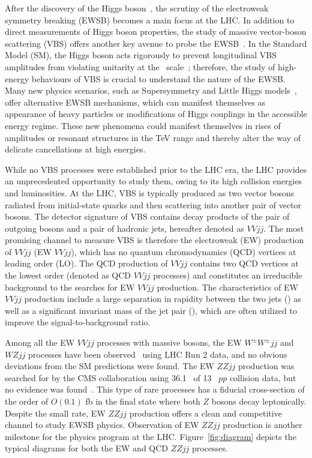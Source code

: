 After the discovery of the Higgs boson~\cite{HIGG-2012-27,CMS-HIG-12-028}, the scrutiny of the electroweak symmetry breaking (EWSB) becomes a main focus at the LHC. In addition to direct measurements of Higgs boson properties, the study of massive vector-boson scattering (VBS) offers another key avenue to probe the EWSB~\cite{Lee:1977yc,Chanowitz:1985hj,Szleper:2014xxa}. In the Standard Model (SM), the Higgs boson acts rigorously to prevent longitudinal VBS amplitudes from violating unitarity at the \TeV~scale~\cite{Lee:1977yc}; therefore, the study of high-energy behaviours of VBS is crucial to understand the nature of the EWSB. Many new physics scenarios, such as Supersymmetry and Little Higgs models~\cite{ArkaniHamed:2002qy}, offer alternative EWSB mechanisms, which can manifest themselves as appearance of heavy particles or modifications of Higgs couplings in the accessible energy regime.
These new phenomena could manifest themselves in rises of amplitudes or resonant structures in the TeV range and thereby alter the way of delicate cancellations at high energies.

While no VBS processes were established prior to the LHC era, the LHC provides an unprecedented opportunity to study them, owing to its high collision energies and luminosities. At the LHC, VBS is typically produced as two vector bosons radiated from initial-state quarks and then scattering into another pair of vector bosons. The detector signature of VBS contains decay products of the pair of outgoing bosons and a pair of hadronic jets, hereafter denoted as $VVjj$. The most promising channel to measure VBS is therefore the electroweak (EW) production of $VVjj$ (EW $VVjj$), which has no quantum chromodynamics (QCD) vertices at leading order (LO).
The QCD production of $VVjj$ contains two QCD vertices at the lowest order (denoted as QCD $VVjj$ processes) and constitutes an irreducible background to the searches for EW $VVjj$ production. The characteristics of EW $VVjj$ production include a large separation in rapidity between the two jets (\dyjj) as well as a significant invariant mass of the jet pair (\mjj), which are often utilized to improve the signal-to-background ratio. 

Among all the EW $VVjj$ processes with massive bosons, the EW $W^{\pm}W^{\pm}jj$ and $WZjj$ processes have been observed~\cite{Aaboud:2019nmv,Aaboud:2018ddq,Sirunyan:2017ret} using LHC Run 2 data, and no obvious deviations from the SM predictions were found. The EW $ZZjj$ production was searched for by the CMS collaboration using 36.1 \ifb~of 13 \TeV~$pp$ collision data, but no evidence was found~\cite{Sirunyan:2017fvv}. This type of rare processes has a fiducial cross-section of the order of $O(0.1)$ fb in the final state where both $Z$ bosons decay leptonically.
Despite the small rate, EW $ZZjj$ production offers a clean and competitive channel to study EWSB physics. Observation of EW $ZZjj$ production is another milestone for the physics program at the LHC. Figure~\ref{fig:diagram} depicts the typical diagrams for both the EW and QCD $ZZjj$ processes. 

